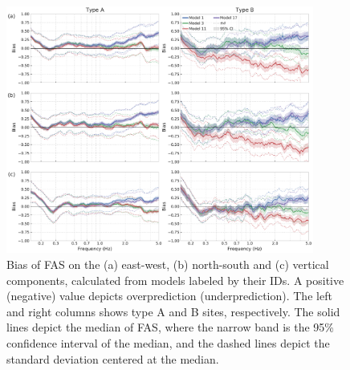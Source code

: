 \begin{figure}[!ht]
  \centering
  \includegraphics[width=0.9\textwidth,height=0.9\textheight,keepaspectratio]{figures/figure_highf_13.pdf}
  \caption{Bias of FAS on the (a) east-west, (b) north-south and (c) vertical components, calculated from models labeled by their IDs. A positive (negative) value depicts overprediction (underprediction). The left and right columns shows type A and B sites, respectively. The solid lines depict the median of FAS, where the narrow band is the 95\% confidence interval of the median, and the dashed lines depict the standard deviation centered at the median.
  }
  \label{fig:highf-13}
\end{figure}
\clearpage

